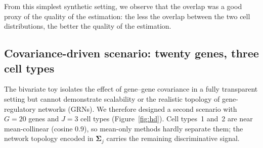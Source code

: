 \documentclass[pdflatex, sn-nature]{sn-jnl}
\theoremstyle{thmstyleone}%
\theoremstyle{thmstyletwo}%
\theoremstyle{thmstylethree}%
\begin{document}
From this simplest synthetic setting, we observe that the overlap was a good proxy of the quality
    of the estimation: the less the overlap between the two cell distributions, the
    better the quality of the estimation.

\subsection{Covariance-driven scenario: twenty genes, three cell types}
\label{sec:hd}

The bivariate toy isolates the effect of gene--gene covariance in a
fully transparent setting but cannot demonstrate scalability or the
realistic topology of gene-regulatory networks (GRNs). We therefore
designed a second scenario with $G=20$ genes and $J=3$ cell types
(Figure~\ref{fig:hd}).
Cell types~1 and~2 are near mean-collinear (cosine \(0.9\)), so mean-only methods
hardly separate them; the network topology encoded in
$\boldsymbol{\Sigma}_{j}$ carries the remaining discriminative signal.
\end{document}
